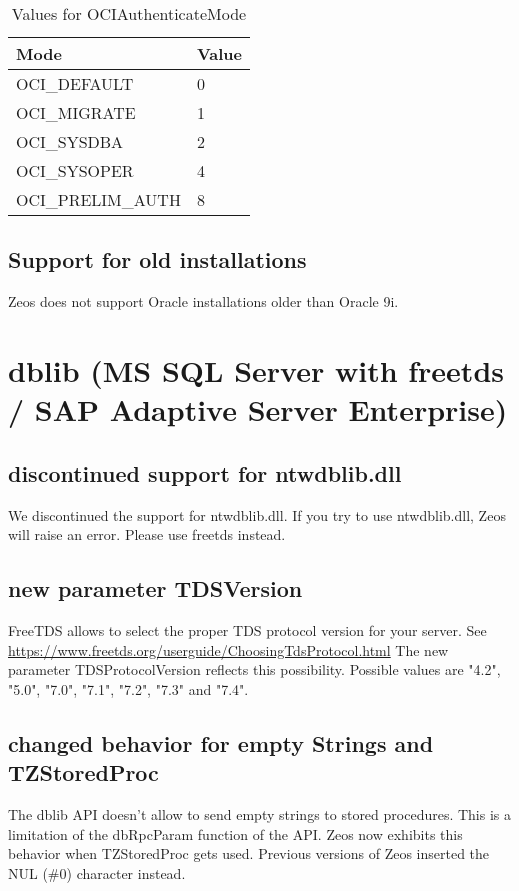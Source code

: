 \documentclass[a4paper,12pt,oneside]{report}
\begin{document}
\begin{table}
    \begin{tabular}{ ll }
	  Mode & Value \\ \hline
    OCI\_DEFAULT & 0 \\
    OCI\_MIGRATE & 1 \\
    OCI\_SYSDBA & 2 \\
    OCI\_SYSOPER & 4 \\
    OCI\_PRELIM\_AUTH & 8 \\
	  \end{tabular}
    \caption{Values for OCIAuthenticateMode}
    \label{tbl:OCIAuthenticateModeValues}
\end{table}

\subsection{Support for old installations}
Zeos does not support Oracle installations older than Oracle 9i.

\FloatBarrier
\section{dblib (MS SQL Server with freetds / SAP Adaptive Server Enterprise)}

\subsection{discontinued support for ntwdblib.dll}
We discontinued the support for ntwdblib.dll.
If you try to use ntwdblib.dll, Zeos will raise an error.
Please use freetds instead.

\subsection{new parameter TDSVersion}
FreeTDS allows to select the proper TDS protocol version for your server.
See \url{https://www.freetds.org/userguide/ChoosingTdsProtocol.html}
The new parameter TDSProtocolVersion reflects this possibility.
Possible values are "4.2", "5.0", "7.0", "7.1", "7.2", "7.3" and "7.4".

\subsection{changed behavior for empty Strings and TZStoredProc}
The dblib API doesn't allow to send empty strings to stored procedures.
This is a limitation of the dbRpcParam function of the API.
Zeos now exhibits this behavior when TZStoredProc gets used.
Previous versions of Zeos inserted the NUL (\#0) character instead.
\end{document}
